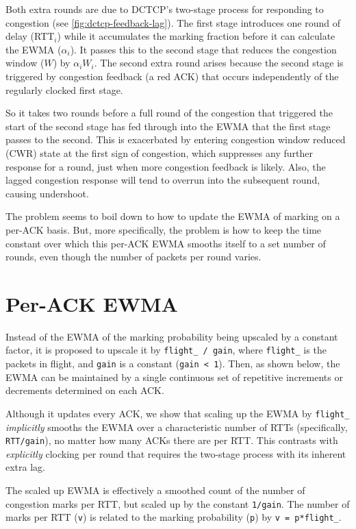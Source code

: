 Both extra rounds are due to DCTCP's two-stage process for responding to
congestion (see \autoref{fig:dctcp-feedback-lag}). The first stage introduces
one round of delay (RTT\(_i\)) while it accumulates the marking fraction before
it can calculate the EWMA (\(\alpha_i\)). It passes this to the second stage
that reduces the congestion window (\(W\)) by \(\alpha_i W_i\). The second extra
round arises because the second stage is triggered by congestion feedback (a red
ACK) that occurs independently of the regularly clocked first stage.

So it takes two rounds before a full round of the congestion that triggered the
start of the second stage has fed through into the EWMA that the first stage
passes to the second. This is exacerbated by entering congestion window reduced
(CWR) state at the first sign of congestion, which suppresses any further
response for a round, just when more congestion feedback is likely. Also, the
lagged congestion response will tend to overrun into the subsequent round,
causing undershoot.

The problem seems to boil down to how to update the EWMA of marking on a per-ACK
basis. But, more specifically, the problem is how to keep the time constant over
which this per-ACK EWMA smooths itself to a set number of rounds, even though
the number of packets per round varies.

\section{Per-ACK EWMA}\label{prresp_Per-Packet_EWMA}

Instead of the EWMA of the marking probability being upscaled by a constant
factor, it is proposed to upscale it by \texttt{flight\_ / gain}, where
\texttt{flight\_} is the packets in flight, and \texttt{gain} is a constant
(\texttt{gain < 1}). Then, as shown below, the EWMA can be maintained by a
single continuous set of repetitive increments or decrements determined on each
ACK.

Although it updates every ACK, we show that scaling up the EWMA by
\texttt{flight\_} \emph{implicitly} smooths the EWMA over a characteristic
number of RTTs (specifically, \texttt{RTT/gain}), no matter how many ACKs there
are per RTT. This contrasts with \emph{explicitly} clocking per
round that requires the two-stage process with its inherent extra lag.

The scaled up EWMA is effectively a smoothed count of the number of congestion
marks per RTT, but scaled up by the constant \texttt{1/gain}. The number of
marks per RTT (\texttt{v}) is related to the marking probability (\texttt{p}) by
\texttt{v = p*flight\_}.

